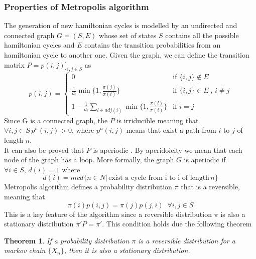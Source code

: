 \documentclass{article}
\newtheorem{theorem}{Theorem}
\begin{document}
\subsubsection{Properties of Metropolis algorithm}
The generation of new hamiltonian cycles is modelled by an undirected and connected graph $G = (S,E)$ whose set of states $S$ contains all the possible hamiltonian cycles and $E$ contains the transition probabilities from an hamiltonian cycle to another one. Given the graph, we can define the transition matrix $P=p(i,j)]_{i,j\in S}$ as
\begin{equation}
p(i,j) =  \begin{cases} 
	0\, & \mbox{if } \{i,j\} \notin E  \\ 
	\frac{1}{d_i} \min\{1,\frac{\pi(j)}{\pi(i)}\} & \mbox{if }  \{i,j\} \in E \;,\, i \neq j\\
	1-\frac{1}{d_i} \sum_{l \in adj(i)} \min\{1,\frac{\pi(l)}{\pi(i)}\}  & \mbox{if }  i = j 
\end{cases}
\end{equation}
Since G is a connected graph, the $P$ is irriducible meaning that $\forall i,j \in S \, p^n(i,j) > 0$, where $p^n(i,j)$ means that exist a path from $i$ to $j$ of length $n$.\\
It can also be proved that $P$ is aperiodic \cite{metropolis}. By aperidoicity we mean that each node of the graph has a loop. More formally, the graph $G$ is aperiodic if $\forall i \in S, \,d(i)  = 1$ where
\begin{equation}
d(i) = mcd \{n \in N | \, \text{exist a cycle from i to i of length} \, n\}
\end{equation}
Metropolis algorithm defines a probability distribution $\pi$ that is a reversible, meaning that
\begin{equation}
	\pi(i)p(i,j) = \pi(j)p(j,i) \;\; \forall i,j \in S
\end{equation}
This is a key feature of the algorithm since a reversible distribution $\pi$ is also a stationary distribution $\pi'P=\pi'$. This condition holds due the following theorem
\begin{theorem}
If a probability distribution $\pi$ is a reversible distribution for a markov chain $ \{X_n\} $, then it is also a stationary distribution.
\end{theorem}
\end{document}
